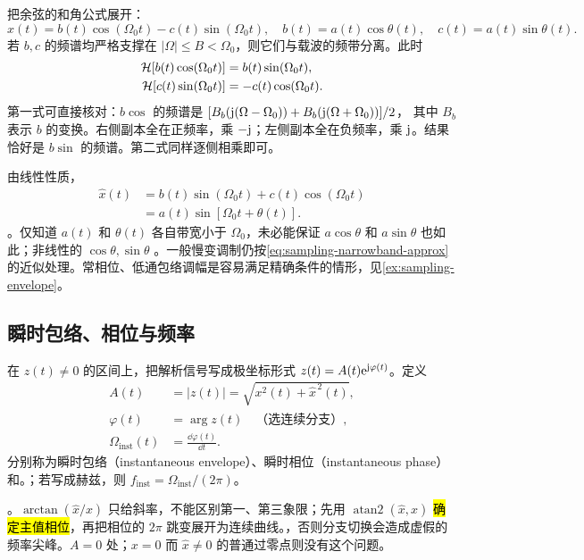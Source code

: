 把余弦的和角公式展开：
\[
  x(t)=b(t)\cos(\Omega_0t)-c(t)\sin(\Omega_0t),
  \quad b(t)=a(t)\cos\theta(t),\quad c(t)=a(t)\sin\theta(t).
\]
若 $b,c$ 的频谱均严格支撑在 $|\Omega|\le B<\Omega_0$，则它们与载波的频带分离。此时
\begin{align*}
  \mathcal{H}[b(t)\cos(\Omega_0t)]&=b(t)\sin(\Omega_0t),\\
  \mathcal{H}[c(t)\sin(\Omega_0t)]&=-c(t)\cos(\Omega_0t).
\end{align*}
第一式可直接核对：$b\cos$ 的频谱是
$[B_b(\mathrm{j}(\Omega-\Omega_0))+B_b(\mathrm{j}(\Omega+\Omega_0))]/2$，
其中 $B_b$ 表示 $b$ 的变换。右侧副本全在正频率，乘 $-\mathrm{j}$；左侧副本全在负频率，乘 $\mathrm{j}$。结果恰好是 $b\sin$ 的频谱。第二式同样逐侧相乘即可。

由线性性质，
\begin{align*}
  \widehat{x}(t)
    &=b(t)\sin(\Omega_0t)+c(t)\cos(\Omega_0t)\\
    &=a(t)\sin[\Omega_0t+\theta(t)].
\end{align*}
。仅知道 $a(t)$ 和 $\theta(t)$ 各自带宽小于 $\Omega_0$，未必能保证 $a\cos\theta$ 和 $a\sin\theta$ 也如此；非线性的 $\cos\theta,\sin\theta$ 。一般慢变调制仍按\cref{eq:sampling-narrowband-approx} 的近似处理。常相位、低通包络调幅是容易满足精确条件的情形，见\cref{ex:sampling-envelope}。

\subsection{瞬时包络、相位与频率}
\label{subsec:sampling-instantaneous-parameters}

在 $z(t)\ne0$ 的区间上，把解析信号写成极坐标形式
$z(t)=A(t)\mathrm{e}^{\mathrm{j}\varphi(t)}$。定义
\begin{equation}
  \begin{aligned}
    A(t)&=|z(t)|=\sqrt{x^2(t)+\widehat{x}^{\,2}(t)},\\
    \varphi(t)&=\arg z(t)\quad\text{（选连续分支）},\\
    \Omega_{\mathrm{inst}}(t)&=\frac{\dd\varphi(t)}{\dd t}.
  \end{aligned}
  \label{eq:sampling-instantaneous-parameters}
\end{equation}
分别称为瞬时包络（instantaneous envelope）、瞬时相位（instantaneous phase）和。；若写成赫兹，则 $f_{\mathrm{inst}}=\Omega_{\mathrm{inst}}/(2\pi)$。

。$\arctan(\widehat{x}/x)$ 只给斜率，不能区别第一、第三象限；先用 $\operatorname{atan2}(\widehat{x},x)$ \hl{确定主值相位}，再把相位的 $2\pi$ 跳变展开为连续曲线。，否则分支切换会造成虚假的频率尖峰。$A=0$ 处；$x=0$ 而 $\widehat{x}\ne0$ 的普通过零点则没有这个问题。

